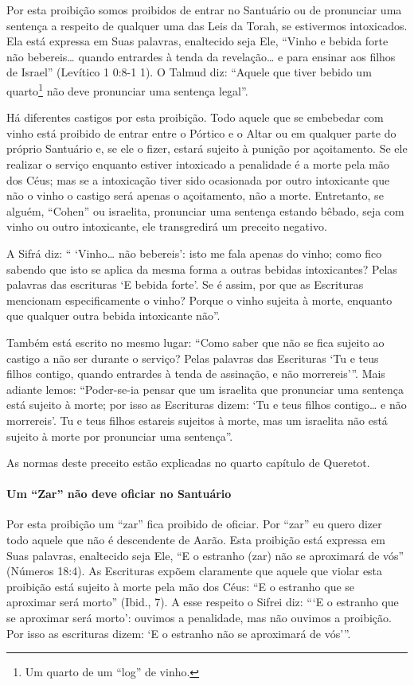 Por esta proibição somos proibidos de entrar no Santuário ou de
pronunciar uma sentença a respeito de qualquer uma das Leis da Torah, se
estivermos intoxicados. Ela está expressa em Suas palavras, enaltecido
seja Ele, ``Vinho e bebida forte não bebereis\ldots{} quando entrardes à
tenda da revelação\ldots{} e para ensinar aos filhos de Israel'' (Levítico 1
0:8-1 1). O Talmud diz: ``Aquele que tiver bebido um
quarto\footnote{Um quarto de um ``log'' de vinho.} não deve pronunciar uma sentença legal''.

Há diferentes castigos por esta proibição. Todo aquele que se embebedar
com vinho está proibido de entrar entre o Pórtico e o Altar ou em
qualquer parte do próprio Santuário e, se ele o fizer, estará sujeito à
punição por açoitamento. Se ele realizar o serviço enquanto estiver
intoxicado a penalidade é a morte pela mão dos Céus; mas se a
intoxicação tiver sido ocasionada por outro intoxicante que não o vinho
o castigo será apenas o açoitamento, não a morte. Entretanto, se alguém,
``Cohen'' ou israelita, pronunciar uma sentença estando bêbado, seja
com vinho ou outro intoxicante, ele transgredirá um preceito negativo.

A Sifrá diz: `` `Vinho\ldots{} não bebereis': isto me fala apenas do vinho;
como fico sabendo que isto se aplica da mesma forma a outras bebidas
intoxicantes? Pelas palavras das escrituras `E bebida forte'. Se é
assim, por que as Escrituras mencionam especificamente o vinho? Porque
o vinho sujeita à morte, enquanto que qualquer outra bebida intoxicante
não''.

Também está escrito no mesmo lugar: ``Como saber que não se fica sujeito
ao castigo a não ser durante o serviço? Pelas palavras das Escrituras
`Tu e teus filhos contigo, quando entrardes à tenda de assinação, e não
morrereis'''. Mais adiante lemos: ``Poder-se-ia pensar que um israelita
que pronunciar uma sentença está sujeito à morte; por isso as Escrituras
dizem: `Tu e teus filhos contigo\ldots{} e não morrereis'. Tu e teus filhos
estareis sujeitos à morte, mas um israelita não está sujeito à morte
por pronunciar uma sentença''.

As normas deste preceito estão explicadas no quarto capítulo de Queretot.

\paragraph{Um ``Zar'' não deve oficiar no Santuário}

Por esta proibição um ``zar'' fica proibido de oficiar. Por ``zar'' eu
quero dizer todo aquele que não é descendente de Aarão. Esta proibição
está expressa em Suas palavras, enaltecido seja Ele, ``E o estranho
(zar) não se aproximará de vós'' (Números 18:4). As Escrituras expõem claramente que
aquele que violar esta proibição está sujeito à morte pela mão dos Céus:
``E o estranho que se aproximar será morto'' (Ibid., 7). A esse respeito
o Sifrei diz: ```E o estranho que se aproximar será morto': ouvimos a
penalidade, mas não ouvimos a proibição. Por isso as escrituras dizem:
`E o estranho não se aproximará de vós'''.

